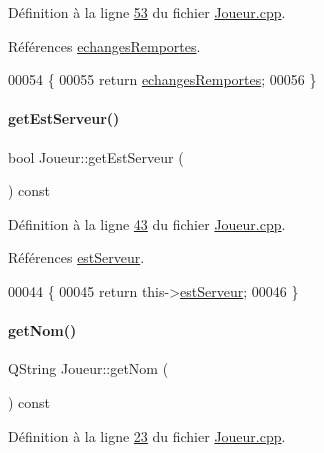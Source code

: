 Définition à la ligne \hyperlink{_joueur_8cpp_source_l00053}{53} du fichier \hyperlink{_joueur_8cpp_source}{Joueur.\+cpp}.



Références \hyperlink{_joueur_8h_source_l00021}{echanges\+Remportes}.


\begin{DoxyCode}
00054 \{
00055     \textcolor{keywordflow}{return} \hyperlink{class_joueur_a23ab203e6bbfc1b2679a8457b99206dc}{echangesRemportes};
00056 \}
\end{DoxyCode}
\mbox{\label{class_joueur_a7bf0e45b6600ae3a68b4afdad6d884b7}} 
\paragraph{\texorpdfstring{get\+Est\+Serveur()}{getEstServeur()}}
{\footnotesize\ttfamily bool Joueur\+::get\+Est\+Serveur (\begin{DoxyParamCaption}{ }\end{DoxyParamCaption}) const}



Définition à la ligne \hyperlink{_joueur_8cpp_source_l00043}{43} du fichier \hyperlink{_joueur_8cpp_source}{Joueur.\+cpp}.



Références \hyperlink{_joueur_8h_source_l00020}{est\+Serveur}.


\begin{DoxyCode}
00044 \{
00045     \textcolor{keywordflow}{return} this->\hyperlink{class_joueur_ac22161c9510ed38d6c65cdf6315737a5}{estServeur};
00046 \}
\end{DoxyCode}
\mbox{\label{class_joueur_a1d7082ab1f926eae1bd6834e901751a7}} 
\paragraph{\texorpdfstring{get\+Nom()}{getNom()}}
{\footnotesize\ttfamily Q\+String Joueur\+::get\+Nom (\begin{DoxyParamCaption}{ }\end{DoxyParamCaption}) const}



Définition à la ligne \hyperlink{_joueur_8cpp_source_l00023}{23} du fichier \hyperlink{_joueur_8cpp_source}{Joueur.\+cpp}.



